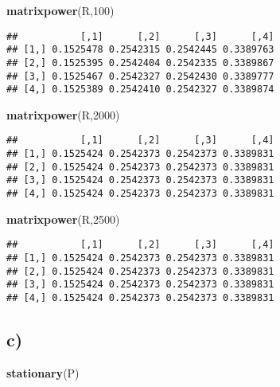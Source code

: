 \documentclass[
]{article}
\newenvironment{Shaded}{\begin{snugshade}}{\end{snugshade}}
\newcommand{\DecValTok}[1]{\textcolor[rgb]{0.00,0.00,0.81}{#1}}
\newcommand{\FunctionTok}[1]{\textcolor[rgb]{0.13,0.29,0.53}{\textbf{#1}}}
\newcommand{\NormalTok}[1]{#1}
\begin{document}
\begin{Shaded}
\begin{Highlighting}[]
\FunctionTok{matrixpower}\NormalTok{(R,}\DecValTok{100}\NormalTok{)}
\end{Highlighting}
\end{Shaded}

\begin{verbatim}
##           [,1]      [,2]      [,3]      [,4]
## [1,] 0.1525478 0.2542315 0.2542445 0.3389763
## [2,] 0.1525395 0.2542404 0.2542335 0.3389867
## [3,] 0.1525467 0.2542327 0.2542430 0.3389777
## [4,] 0.1525389 0.2542410 0.2542327 0.3389874
\end{verbatim}

\begin{Shaded}
\begin{Highlighting}[]
\FunctionTok{matrixpower}\NormalTok{(R,}\DecValTok{2000}\NormalTok{)}
\end{Highlighting}
\end{Shaded}

\begin{verbatim}
##           [,1]      [,2]      [,3]      [,4]
## [1,] 0.1525424 0.2542373 0.2542373 0.3389831
## [2,] 0.1525424 0.2542373 0.2542373 0.3389831
## [3,] 0.1525424 0.2542373 0.2542373 0.3389831
## [4,] 0.1525424 0.2542373 0.2542373 0.3389831
\end{verbatim}

\begin{Shaded}
\begin{Highlighting}[]
\FunctionTok{matrixpower}\NormalTok{(R,}\DecValTok{2500}\NormalTok{)}
\end{Highlighting}
\end{Shaded}

\begin{verbatim}
##           [,1]      [,2]      [,3]      [,4]
## [1,] 0.1525424 0.2542373 0.2542373 0.3389831
## [2,] 0.1525424 0.2542373 0.2542373 0.3389831
## [3,] 0.1525424 0.2542373 0.2542373 0.3389831
## [4,] 0.1525424 0.2542373 0.2542373 0.3389831
\end{verbatim}

\hypertarget{c}{%
\subsection{c)}\label{c}}

\begin{Shaded}
\begin{Highlighting}[]
\FunctionTok{stationary}\NormalTok{(P)}
\end{Highlighting}
\end{Shaded}
\end{document}

